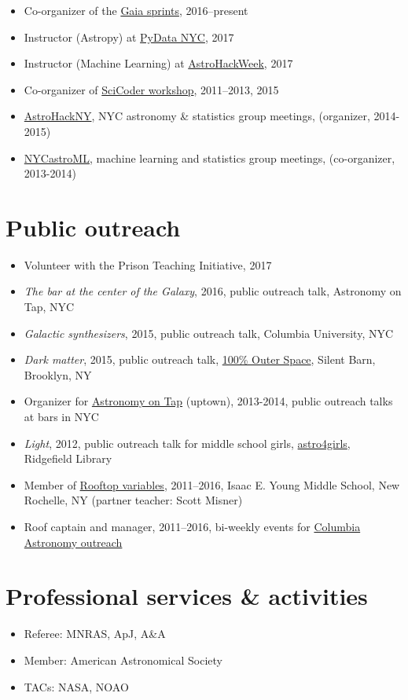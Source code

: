 \documentclass[12pt, letterpaper]{apw-cv}
\begin{document}
\begin{itemize}
    \item Co-organizer of the \href{http://gaia.lol}{Gaia sprints}, 2016--present
    \item Instructor (Astropy) at \href{http://pydata.org/nyc2017}{PyData NYC}, 2017
    \item Instructor (Machine Learning) at \href{http://astrohackweek.org}{AstroHackWeek}, 2017
    \item Co-organizer of \href{http://scicoder.org}{SciCoder workshop}, 2011--2013, 2015
    \item \href{https://groups.google.com/forum/#!forum/astrohackny}{AstroHackNY}, NYC astronomy \& statistics group meetings, (organizer, 2014-2015)
    \item \href{https://github.com/adrn/nycastroml}{NYCastroML}, machine learning and statistics group meetings, (co-organizer, 2013-2014)
\end{itemize}

\section*{Public outreach}

\begin{itemize}
    \item Volunteer with the Prison Teaching Initiative, 2017
    \item \emph{The bar at the center of the Galaxy}, 2016, public outreach talk, Astronomy on Tap, NYC
    \item \emph{Galactic synthesizers}, 2015, public outreach talk, Columbia University, NYC
    \item \emph{Dark matter}, 2015, public outreach talk, \href{http://silentbarn.org/2015/03/100-outer-space-party}{100\% Outer Space}, Silent Barn, Brooklyn, NY
    \item Organizer for \href{http://astronomyontap.org/}{Astronomy on Tap} (uptown), 2013-2014, public outreach talks at bars in NYC
    \item \emph{Light}, 2012, public outreach talk for middle school girls, \href{http://www.newstimes.com/news/article/Astronomer-Shoot-for-the-stars-3380793.php}{astro4girls}, Ridgefield Library
    \item Member of \href{http://rv.astro.columbia.edu}{Rooftop variables}, 2011--2016, Isaac E. Young Middle School, New Rochelle, NY (partner teacher: Scott Misner)
    \item Roof captain and manager, 2011--2016, bi-weekly events for \href{http://outreach.astro.columbia.edu/}{Columbia Astronomy outreach}
\end{itemize}

\section*{Professional services \& activities}

\begin{itemize}
	\item Referee: MNRAS, ApJ, A\&A
	\item Member: American Astronomical Society
    \item TACs: NASA, NOAO
\end{itemize}
\end{document}
